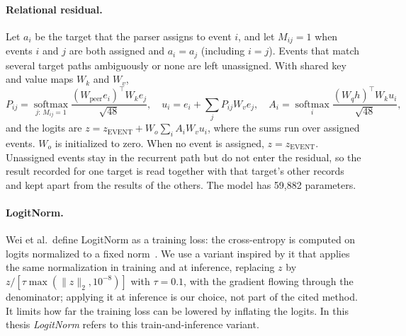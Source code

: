 \paragraph{Relational residual.} Let $a_i$ be the target that the
parser assigns to event $i$, and let $M_{ij}=1$ when events $i$ and $j$
are both assigned and $a_i=a_j$ (including $i=j$). Events that match
several target paths ambiguously or none are left unassigned. With
shared key and value maps $W_k$ and $W_v$,
\begin{equation}
  P_{ij}=\operatorname*{softmax}_{j:\,M_{ij}=1}
    \frac{(W_{\mathrm{peer}}e_i)^{\top}W_k e_j}{\sqrt{48}},\quad
  u_i=e_i+\sum_j P_{ij}W_v e_j,\quad
  A_i=\operatorname*{softmax}_{i}\frac{(W_q h)^{\top}W_k u_i}{\sqrt{48}},
  \label{eq:relation-attn}
\end{equation}
and the logits are $z=z_{\mathrm{EVENT}}+W_o\sum_i A_iW_v u_i$, where
the sums run over assigned events. $W_o$ is initialized to zero. When no
event is assigned, $z=z_{\mathrm{EVENT}}$. Unassigned events stay in the
recurrent path but do not enter the residual, so the result recorded for one target is
read together with that target's other records and kept apart from the
results of the others. The model has 59,882 parameters.

\paragraph{LogitNorm.} Wei et al.\ define LogitNorm as a training
loss: the cross-entropy is computed on logits normalized to a fixed
norm~\cite{wei2022mitigating}. We use a variant inspired by it that
applies the same normalization in training and at inference, replacing
$z$ by $z/[\tau\max(\|z\|_2,10^{-8})]$ with $\tau=0.1$, with the gradient
flowing through the denominator; applying it at inference is our
choice, not part of the cited method. It limits how far the training
loss can be lowered by inflating the logits. In this thesis
\emph{LogitNorm} refers to this train-and-inference variant.

